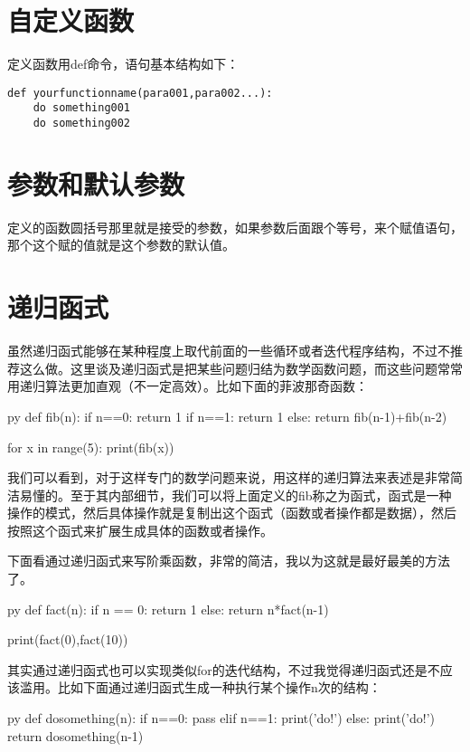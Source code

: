 \documentclass[12pt,oneside]{book}
\begin{document}
\begin{common-format}
\section{自定义函数}
定义函数用def命令，语句基本结构如下：
\begin{Verbatim}
def yourfunctionname(para001,para002...):
    do something001
    do something002
\end{Verbatim}

\section{参数和默认参数}
定义的函数圆括号那里就是接受的参数，如果参数后面跟个等号，来个赋值语句，那个这个赋的值就是这个参数的默认值。

\section{递归函式}
虽然递归函式能够在某种程度上取代前面的一些循环或者迭代程序结构，不过不推荐这么做。这里谈及递归函式是把某些问题归结为数学函数问题，而这些问题常常用递归算法更加直观（不一定高效）。比如下面的菲波那奇函数：
\begin{xverbatim}[129]{py}
def fib(n):
    if n==0:
        return 1
    if n==1:
        return 1
    else:
        return fib(n-1)+fib(n-2)
        
for x in range(5):
    print(fib(x))
\end{xverbatim}
我们可以看到，对于这样专门的数学问题来说，用这样的递归算法来表述是非常简洁易懂的。至于其内部细节，我们可以将上面定义的fib称之为函式，函式是一种操作的模式，然后具体操作就是复制出这个函式（函数或者操作都是数据），然后按照这个函式来扩展生成具体的函数或者操作。

下面看通过递归函式来写阶乘函数，非常的简洁，我以为这就是最好最美的方法了。
\begin{xverbatim}[129]{py}
def fact(n):
    if n == 0:
        return 1
    else:
        return n*fact(n-1)
        
print(fact(0),fact(10))
\end{xverbatim}

其实通过递归函式也可以实现类似for的迭代结构，不过我觉得递归函式还是不应该滥用。比如下面通过递归函式生成一种执行某个操作n次的结构：

\begin{xverbatim}[129]{py}
def dosomething(n):
    if n==0:
        pass
    elif n==1:
        print('do!')
    else:
        print('do!')
        return dosomething(n-1)


\end{xverbatim}
\end{common-format}
\end{document}
